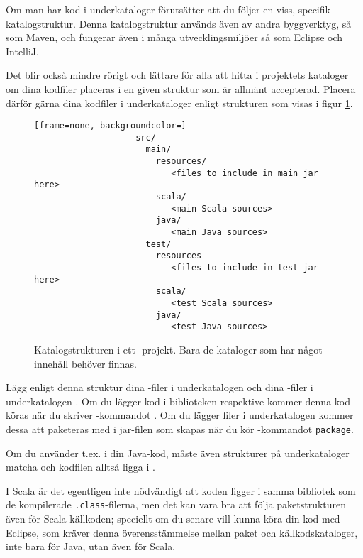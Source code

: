 Om man har kod i underkataloger förutsätter \sbt att du följer en viss, specifik katalogstruktur. Denna katalogstruktur används även av andra byggverktyg, så som Maven, och fungerar även i många utvecklingsmiljöer så som Eclipse och IntelliJ. 

Det blir också mindre rörigt och lättare för alla att hitta i projektets kataloger om dina kodfiler placeras i en given struktur som är allmänt accepterad.
Placera därför gärna dina kodfiler i underkataloger enligt strukturen som visas i figur \ref{fig:sbt:dir-structure}. 

\begin{figure}[H]
\centering

\begin{lstlisting}[frame=none, backgroundcolor=]
					src/
					  main/
					    resources/
					       <files to include in main jar here>
					    scala/
					       <main Scala sources>
					    java/
					       <main Java sources>
					  test/
					    resources
					       <files to include in test jar here>
					    scala/
					       <test Scala sources>
					    java/
					       <test Java sources>
\end{lstlisting}

\caption{Katalogstrukturen i ett \sbt-projekt. Bara de kataloger som har något innehåll behöver finnas.}
\label{fig:sbt:dir-structure}
\end{figure}

\noindent Lägg enligt denna struktur dina -filer i underkatalogen  och dina -filer i underkatalogen . Om du lägger kod i biblioteken   respektive  kommer denna kod köras när du skriver \sbt-kommandot . Om du lägger filer i underkatalogen  kommer dessa att paketeras med i jar-filen som skapas när du kör \sbt-kommandot \texttt{package}.

Om du använder t.ex.  i din Java-kod, måste även strukturer på underkataloger matcha och kodfilen alltså ligga i  .

I Scala är det egentligen inte nödvändigt att koden ligger i samma bibliotek som de kompilerade \texttt{.class}-filerna, men det kan vara bra att följa paketstrukturen även för Scala-källkoden; speciellt om du senare vill kunna köra din kod med Eclipse, som kräver denna överensstämmelse mellan paket och källkodskataloger, inte bara för Java, utan även för Scala.


